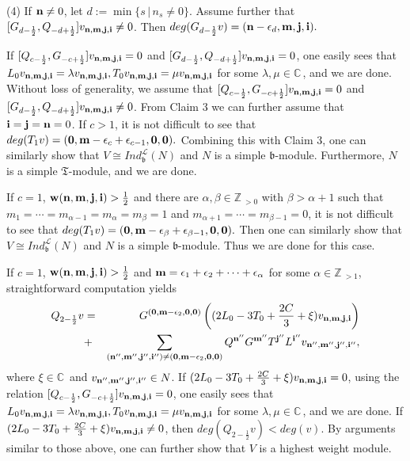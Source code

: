 \documentclass[12pt]{article}
\def\a{\alpha}
\def\b{\beta}
\def\l{\lambda}
\def\ssc{\scriptscriptstyle}
\def\Z{\mathbb{Z}{\ssc\,}}
\def\C{\mathbb{C}{\ssc\,}}
\numberwithin{equation}{section}
\begin{document}
(4) If $ {\bf n}\ne 0$, let $d:=\min\{s\,|\,n_s\ne 0\}.$  Assume further that $[G_{d-\frac{1}{2}}, Q_{-d+\frac{1}{2}}]v_{{\bf n,m,j,i}}\ne 0$. Then $deg(G_{d-\frac{1}{2}}v)=({\bf n}-\epsilon_d,{\bf m,j,i}).$

If  $[Q_{c-\frac{1}{2}}, G_{-c+\frac{1}{2}}]v_{{\bf n,m,j,i}}=0$ and $[G_{d-\frac{1}{2}}, Q_{-d+\frac{1}{2}}]v_{{\bf n,m,j,i}}=0$, one  easily sees that $L_0v_{{\bf n,m,j,i}}=\l v_{{\bf n,m,j,i}}, T_0v_{{\bf n,m,j,i}}=\mu v_{{\bf n,m,j,i}}$ for some $\l,\mu\in\C$, and we are done. Without loss of generality, we assume that $[Q_{c-\frac{1}{2}}, G_{-c+\frac{1}{2}}]v_{{\bf n,m,j,i}}=0$ and $[G_{d-\frac{1}{2}}, Q_{-d+\frac{1}{2}}]v_{{\bf n,m,j,i}}\ne 0$. From Claim 3 we can further assume that ${\bf i}= {\bf j}={\bf n}=0$.
If $c>1$, it is not difficult to see that $deg(T_1v)=({\bf 0},{\bf m}-\epsilon_c+\epsilon_{c-1},{\bf 0,0}).$  Combining this with Claim 3, one can similarly  show that
$V\cong Ind^{\mathcal{L}}_{\mathfrak{b}}(N)$ and $N$ is a simple $\mathfrak{b}$-module. Furthermore, $N$ is a simple $\mathfrak{T}$-module, and we are done.

If $c=1$, ${\bf w(n,m,j,i)}>\frac{1}{2}$ and there are $\a,\b\in \Z_{>0}$ with $\b>\a+1$ such that $m_1=\cdots=m_{\a-1}=m_\a=m_\b=1$ and $m_{\a+1}=\cdots=m_{\b-1}=0$, it is not difficult to see that $deg(T_1v)=({\bf 0},{\bf m}-\epsilon_\b+\epsilon_{\b-1},{\bf 0,0}).$ Then one can similarly show that $V\cong Ind^{\mathcal{L}}_{\mathfrak{b}}(N)$ and $N$ is a simple $\mathfrak{b}$-module. Thus we are done for this case.


If $c=1$, ${\bf w(n,m,j,i)}>\frac{1}{2}$ and ${\bf m}=\epsilon_1+\epsilon_2+\cdots +\epsilon_\a$ for some $\a\in\Z_{>1}$,  straightforward computation yields
\begin{eqnarray*}Q_{2-\frac{1}{2}}v&=&G^{({\bf 0},{\bf m}-\epsilon_2,{\bf 0}, {\bf 0})}\left((2L_0-3T_0+\frac{2C}{3}+\xi)v_{{\bf n,m,j,i}}\right)\\&+& \sum\limits_{({\bf n'',m'',j'',i''})\ne ({\bf 0},{\bf m}-\epsilon_2,{\bf 0}, {\bf 0})}Q^{\bf n''}G^{\bf m''}T^{\bf j''}L^{\bf i''}v_{\bf n'',m'',j'',i''},\end{eqnarray*}
where $\xi\in\C$ and $v_{\bf n'',m'',j'',i''}\in N$. If $(2L_0-3T_0+\frac{2C}{3}+\xi)v_{{\bf n,m,j,i}}=0$, using the relation $[Q_{c-\frac{1}{2}}, G_{-c+\frac{1}{2}}]v_{{\bf n,m,j,i}}=0$,  one  easily sees that $L_0v_{{\bf n,m,j,i}}=\l v_{{\bf n,m,j,i}}, T_0v_{{\bf n,m,j,i}}=\mu v_{{\bf n,m,j,i}}$ for some $\l,\mu\in\C$, and we are done.   If $(2L_0-3T_0+\frac{2C}{3}+\xi)v_{{\bf n,m,j,i}}\ne 0$, then  $deg(Q_{2-\frac{1}{2}}v)<deg(v)$. By arguments similar to those above, one can further show that $V$ is a highest weight module.
\end{document}
